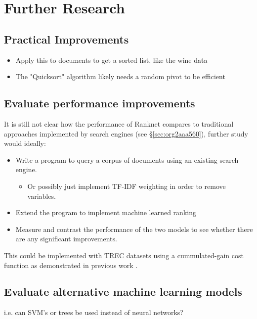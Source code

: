 \documentclass[a4paper,11pt,twoside]{article}
\begin{document}
\section{Further Research}
\label{sec:org0e5fe01}


\subsection{Practical Improvements}
\label{sec:orgbeef6ca}

\begin{itemize}
\item Apply this to documents to get a sorted list, like the wine data
\item The "Quicksort" algorithm likely needs a random pivot to be efficient \cite{timroughgardenQuicksortOverview2017}
\end{itemize}

\subsection{Evaluate performance improvements}
\label{sec:orgc8f1146}

It is still not clear how the
performance of Ranknet compares to traditional approaches
implemented by search engines (see \S \ref{sec:org2aaa560}), further
study would ideally:

\begin{itemize}
\item Write a program to query a corpus of documents using an existing search engine.
\begin{itemize}
\item Or possibly just implement TF-IDF weighting in order to remove variables.
\end{itemize}
\item Extend the program to implement machine learned ranking
\item Measure and contrast the performance of the two models to see
whether there are any significant improvements.
\end{itemize}

This could be implemented with TREC datasets
\cite{usnationalinstituteofstandardsandtechnologyTextREtrievalConference}
using a cummulated-gain cost function
\cite{jarvelinCumulatedGainbasedEvaluation2002} as demonstrated in
previous work \cite{viksinghComparisonOpenSource2009}.

\subsection{Evaluate alternative machine learning models}
\label{sec:org264b1de}
i.e. can SVM's or trees be used instead of neural networks?
\end{document}
